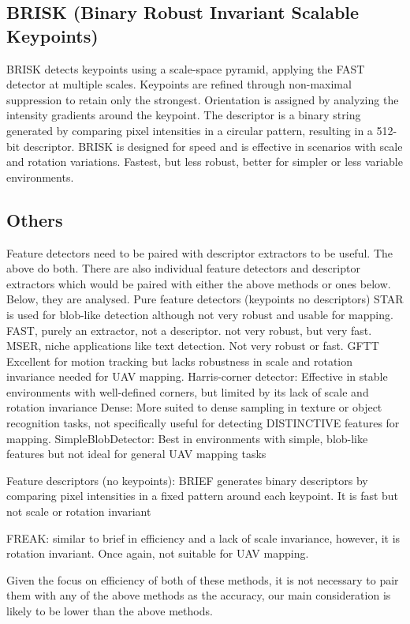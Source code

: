 \subsection*{BRISK (Binary Robust Invariant Scalable Keypoints)}
BRISK detects keypoints using a scale-space pyramid, applying the FAST detector at multiple scales. Keypoints are refined through non-maximal suppression to retain only the strongest. Orientation is assigned by analyzing the intensity gradients around the keypoint. The descriptor is a binary string generated by comparing pixel intensities in a circular pattern, resulting in a 512-bit descriptor. BRISK is designed for speed and is effective in scenarios with scale and rotation variations.
Fastest, but less robust, better for simpler or less variable environments.


\subsection*{Others}
Feature detectors need to be paired with descriptor extractors to be useful. The above do both. There are also individual feature detectors and descriptor extractors which would be paired with either the above methods or ones below. Below, they are analysed. 
Pure feature detectors (keypoints no descriptors)
STAR is used for blob-like detection although not very robust and usable for mapping. 
FAST, purely an extractor, not a descriptor. not very robust, but very fast.
MSER, niche applications like text detection. Not very robust or fast.
GFTT Excellent for motion tracking but lacks robustness in scale and rotation invariance needed for UAV mapping.
Harris-corner detector: Effective in stable environments with well-defined corners, but limited by its lack of scale and rotation invariance
Dense: More suited to dense sampling in texture or object recognition tasks, not specifically useful for detecting DISTINCTIVE features for mapping.
SimpleBlobDetector: Best in environments with simple, blob-like features but not ideal for general UAV mapping tasks


Feature descriptors (no keypoints):
BRIEF generates binary descriptors by comparing pixel intensities in a fixed pattern around each keypoint. It is fast but not scale or rotation invariant

FREAK: similar to brief in efficiency and a lack of scale invariance, however, it is rotation invariant. Once again, not suitable for UAV mapping.

Given the focus on efficiency of both of these methods, it is not necessary to pair them with any of the above methods as the accuracy, our main consideration is likely to be lower than the above methods.









